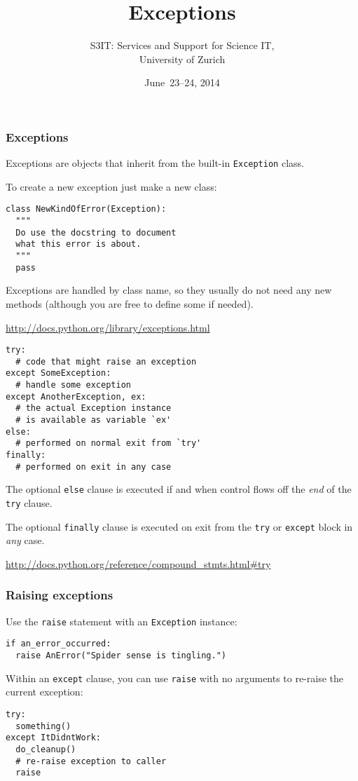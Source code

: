 \documentclass[english,serif,mathserif,xcolor=pdftex,dvipsnames,table]{beamer}
\title[Part 7]{%
  Exceptions
}
\author[S3IT]{%
  S3IT: Services and Support for Science IT, \\
  University of Zurich
}
\date{June~23--24, 2014}
\begin{document}
\maketitle


\begin{frame}[fragile]
  \frametitle{Exceptions}

  Exceptions are objects that inherit from the built-in
  \lstinline|Exception| class.

  \+
  To create a new exception just make a new class:
\begin{lstlisting}
class NewKindOfError(Exception):
  """
  Do use the docstring to document
  what this error is about.
  """
  pass
\end{lstlisting}

  \+
  Exceptions are handled by class name, so they usually do not need
  any new methods (although you are free to define some if needed).

  \begin{seealso}
    \url{http://docs.python.org/library/exceptions.html}
  \end{seealso}
\end{frame}


\begin{frame}[fragile]
\begin{lstlisting}
try:
  # code that might raise an exception
except SomeException:
  # handle some exception
except AnotherException, ex:
  # the actual Exception instance
  # is available as variable `ex'
else:
  # performed on normal exit from `try'
finally:
  # performed on exit in any case
\end{lstlisting}

  \+
  The optional \lstinline|else| clause is executed if and when control flows off the
  \emph{end} of the \lstinline|try| clause.

  \+
  The optional \lstinline|finally| clause is executed on exit from the
  \lstinline|try| or \lstinline|except| block in \emph{any} case.

  \begin{references}
    \scriptsize
    \url{http://docs.python.org/reference/compound_stmts.html#try}
\end{references}
\end{frame}


\begin{frame}[fragile]
  \frametitle{Raising exceptions}

  Use the \lstinline|raise| statement with an \texttt{Exception}
  instance:
\begin{lstlisting}
if an_error_occurred:
  raise AnError("Spider sense is tingling.")
\end{lstlisting}

  \+
  Within an \lstinline|except| clause, you can use \lstinline|raise|
  with no arguments to re-raise the current exception:
\begin{lstlisting}
try:
  something()
except ItDidntWork:
  do_cleanup()
  # re-raise exception to caller
  raise
\end{lstlisting}
\end{frame}
\end{document}
